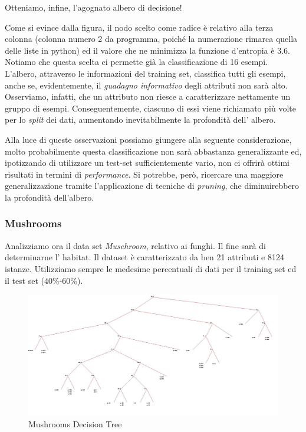 			Otteniamo, infine, l'agognato albero di decisione!\par
			Come si evince dalla figura, il nodo scelto come radice è relativo alla terza colonna (colonna numero 2 da programma, poiché la numerazione rimarca quella delle liste in python) ed il valore che ne minimizza la funzione d'entropia è 3.6. Notiamo che questa scelta ci permette già la classificazione di 16 esempi.
			L'albero, attraverso le informazioni del training set, classifica tutti gli esempi, anche se, evidentemente, il \emph{guadagno informativo} degli attributi non sarà alto. Osserviamo, infatti, che un attributo non riesce a caratterizzare nettamente un gruppo di esempi. Conseguentemente, ciascuno di essi viene richiamato più volte per lo \emph{split} dei dati, aumentando inevitabilmente la profondità dell' albero.\par
			Alla luce di queste osservazioni possiamo giungere alla seguente considerazione, molto probabilmente questa classificazione non sarà abbastanza generalizzante ed, ipotizzando di utilizzare un test-set sufficientemente vario, non ci offrirà ottimi risultati in termini di \emph{performance}. Si potrebbe, però, ricercare una maggiore generalizzazione tramite l'applicazione di tecniche di \emph{pruning}, che diminuirebbero la profondità dell'albero.\par
		\subsubsection{Mushrooms} 
			Analizziamo ora il data set \emph{Muschroom}, relativo ai funghi. Il fine sarà di determinarne l' habitat. Il dataset è caratterizzato da ben 21 attributi e 8124 istanze. Utilizziamo sempre le medesime percentuali di dati per il training set ed il test set (40\%-60\%).
			
			\begin{figure}
				\includegraphics[width=1.2\textwidth, height=0.9\textheight]{mushroom.jpg}
				\caption{Mushrooms Decision Tree}
				\label{fig:mus-dt}
			\end{figure}
			
